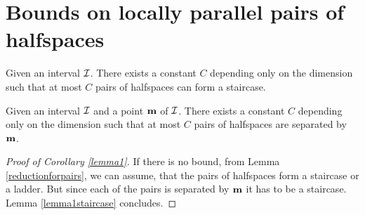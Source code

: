 \section{Bounds on locally parallel pairs of halfspaces}


\begin{lemma}\label{lemma1staircase}
Given an interval $\mathcal{I}$. There exists a constant $C$ depending only on the dimension such that at most $C$ pairs of \adjP halfspaces can form a staircase.
\end{lemma}

\begin{corollary}\label{lemma1}
Given an interval $\mathcal{I}$ and a point $\mathbf{m}$ of $\mathcal{I}$. There exists a constant $C$ depending only on the dimension such that at most $C$ pairs of \adjP halfspaces are separated by $\mathbf{m}$.
\end{corollary}


\begin{proof}[Proof of Corollary \ref{lemma1}]
If there is no bound, from Lemma \ref{reductionforpairs}, we can assume, that the pairs of \adjP halfspaces form a staircase or a ladder. But since each of the pairs is separated by $\mathbf{m}$ it has to be a staircase. Lemma \ref{lemma1staircase} concludes.
\end{proof}

